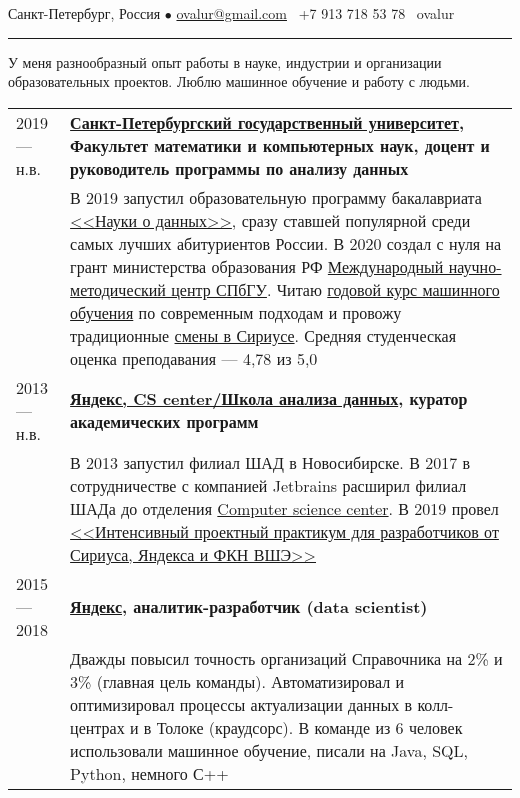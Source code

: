 \documentclass[11pt]{article}
\begin{document}
%

\vspace{0.5em}

\noindent Санкт-Петербург, Россия $\bullet$ \href{mailto:ovalur@gmail.com}{ovalur@gmail.com} \faMobile~+7 913 718 53 78 \faSendO~ovalur

\vspace{0.5em}
\hrule
\vspace{0.5em}

У меня разнообразный опыт работы в науке, индустрии и организации образовательных проектов. Люблю машинное обучение и работу с людьми.

\vspace{0.5em}
\begin{longtable} {l | p{}}
2019 — н.в. & {\textbf{\href{https://spbu.ru}{Санкт-Петербургский государственный университет}, Факультет математики и компьютерных наук, доцент и руководитель программы по анализу данных}} \\

& {В 2019 запустил образовательную программу бакалавриата \href{https://maad.compscicenter.ru}{<<Науки о данных>>}, сразу ставшей популярной среди самых лучших абитуриентов России. В 2020 создал с нуля на грант министерства образования РФ \href{https://gsom.spbu.ru/all_news/event2021-02-04/}{Международный научно-методический центр СПбГУ}. Читаю \href{https://github.com/spbu-math-cs/ml-course/}{годовой курс машинного обучения} по современным подходам и провожу традиционные \href{https://sochisirius.ru/obuchenie/nauka/smena1078/5204}{смены в Сириусе}. Средняя студенческая оценка преподавания — 4,78 из 5,0} \\

2013 — н.в. & {\textbf{\href{https://compscicenter.ru}{Яндекс, CS center/Школа анализа данных}, куратор академических программ}} \\

& {В 2013 запустил филиал ШАД в Новосибирске. В 2017 в сотрудничестве с компанией Jetbrains расширил филиал ШАДа до отделения \href{https://compscicenter.ru}{Computer science center}. В 2019 провел \href{https://sochisirius.ru/obuchenie/graduates/smena240/1174}{<<Интенсивный проектный практикум для разработчиков от Сириуса, Яндекса и ФКН ВШЭ>>}} \\

2015 — 2018 & {\textbf{\href{https://yandex.ru/}{Яндекс}, аналитик-разработчик (data scientist)}} \\
& {Дважды повысил точность организаций Справочника на 2\% и 3\% (главная цель команды). Автоматизировал и оптимизировал процессы актуализации данных в колл-центрах и в Толоке (краудсорс). В команде из 6 человек использовали машинное обучение, писали на Java, SQL, Python, немного С++} \\


\end{longtable}
\end{document}
